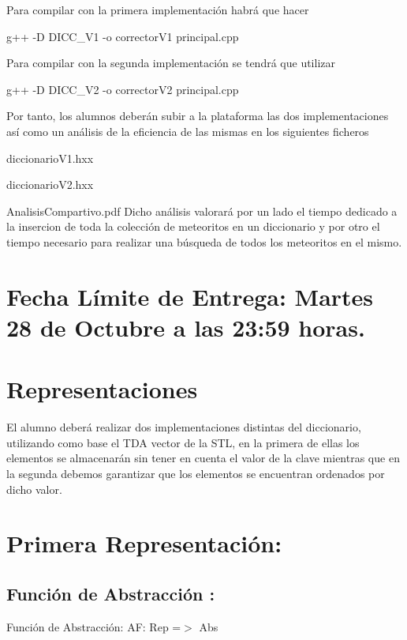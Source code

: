 \-Para compilar con la primera implementación habrá que hacer

\begin{DoxyItemize}
\item g++ -\/\-D \-D\-I\-C\-C\-\_\-\-V1 -\/o corrector\-V1 principal.\-cpp\end{DoxyItemize}
\-Para compilar con la segunda implementación se tendrá que utilizar

\begin{DoxyItemize}
\item g++ -\/\-D \-D\-I\-C\-C\-\_\-\-V2 -\/o corrector\-V2 principal.\-cpp\end{DoxyItemize}
\-Por tanto, los alumnos deberán subir a la plataforma las dos implementaciones así como un análisis de la eficiencia de las mismas en los siguientes ficheros

\begin{DoxyItemize}
\item diccionario\-V1.\-hxx \item diccionario\-V2.\-hxx \item \-Analisis\-Compartivo.\-pdf \-Dicho análisis valorará por un lado el tiempo dedicado a la insercion de toda la colección de meteoritos en un diccionario y por otro el tiempo necesario para realizar una búsqueda de todos los meteoritos en el mismo.\end{DoxyItemize}
\hypertarget{index_fecha}{}\section{\-Fecha Límite de Entrega\-: Martes 28 de Octubre a las 23\-:59 horas.}\label{index_fecha}
\hypertarget{index_rep}{}\section{\-Representaciones}\label{index_rep}
\-El alumno deberá realizar dos implementaciones distintas del diccionario, utilizando como base el \-T\-D\-A vector de la \-S\-T\-L, en la primera de ellas los elementos se almacenarán sin tener en cuenta el valor de la clave mientras que en la segunda debemos garantizar que los elementos se encuentran ordenados por dicho valor.\hypertarget{index_primera}{}\section{\-Primera Representación\-:}\label{index_primera}
\hypertarget{index_fact_sec1}{}\subsection{\-Función de Abstracción \-:}\label{index_fact_sec1}
\-Función de \-Abstracción\-: \-A\-F\-: \-Rep =$>$ \-Abs

